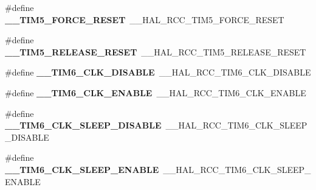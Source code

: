 \begin{DoxyCompactItemize}
\item 
\mbox{\label{group___h_a_l___r_c_c___aliased_gaa07976dd4fea46ea3607d60c91135d57}} 
\#define {\bfseries \+\_\+\+\_\+\+T\+I\+M5\+\_\+\+F\+O\+R\+C\+E\+\_\+\+R\+E\+S\+ET}~\+\_\+\+\_\+\+H\+A\+L\+\_\+\+R\+C\+C\+\_\+\+T\+I\+M5\+\_\+\+F\+O\+R\+C\+E\+\_\+\+R\+E\+S\+ET
\item 
\mbox{\label{group___h_a_l___r_c_c___aliased_ga9147d36f3775a32d40f0abcf2fd38fef}} 
\#define {\bfseries \+\_\+\+\_\+\+T\+I\+M5\+\_\+\+R\+E\+L\+E\+A\+S\+E\+\_\+\+R\+E\+S\+ET}~\+\_\+\+\_\+\+H\+A\+L\+\_\+\+R\+C\+C\+\_\+\+T\+I\+M5\+\_\+\+R\+E\+L\+E\+A\+S\+E\+\_\+\+R\+E\+S\+ET
\item 
\mbox{\label{group___h_a_l___r_c_c___aliased_ga16facf74d71ea54b2a9da63cffe0c99a}} 
\#define {\bfseries \+\_\+\+\_\+\+T\+I\+M6\+\_\+\+C\+L\+K\+\_\+\+D\+I\+S\+A\+B\+LE}~\+\_\+\+\_\+\+H\+A\+L\+\_\+\+R\+C\+C\+\_\+\+T\+I\+M6\+\_\+\+C\+L\+K\+\_\+\+D\+I\+S\+A\+B\+LE
\item 
\mbox{\label{group___h_a_l___r_c_c___aliased_gaa4a746941c7432e4c3cbf7530cbd0b36}} 
\#define {\bfseries \+\_\+\+\_\+\+T\+I\+M6\+\_\+\+C\+L\+K\+\_\+\+E\+N\+A\+B\+LE}~\+\_\+\+\_\+\+H\+A\+L\+\_\+\+R\+C\+C\+\_\+\+T\+I\+M6\+\_\+\+C\+L\+K\+\_\+\+E\+N\+A\+B\+LE
\item 
\mbox{\label{group___h_a_l___r_c_c___aliased_ga03bbe3efed06a8df35996cb58c890af4}} 
\#define {\bfseries \+\_\+\+\_\+\+T\+I\+M6\+\_\+\+C\+L\+K\+\_\+\+S\+L\+E\+E\+P\+\_\+\+D\+I\+S\+A\+B\+LE}~\+\_\+\+\_\+\+H\+A\+L\+\_\+\+R\+C\+C\+\_\+\+T\+I\+M6\+\_\+\+C\+L\+K\+\_\+\+S\+L\+E\+E\+P\+\_\+\+D\+I\+S\+A\+B\+LE
\item 
\mbox{\label{group___h_a_l___r_c_c___aliased_ga0dd96378a8b3691ff2f29d93e80f4291}} 
\#define {\bfseries \+\_\+\+\_\+\+T\+I\+M6\+\_\+\+C\+L\+K\+\_\+\+S\+L\+E\+E\+P\+\_\+\+E\+N\+A\+B\+LE}~\+\_\+\+\_\+\+H\+A\+L\+\_\+\+R\+C\+C\+\_\+\+T\+I\+M6\+\_\+\+C\+L\+K\+\_\+\+S\+L\+E\+E\+P\+\_\+\+E\+N\+A\+B\+LE
\item 
\mbox{\label{group___h_a_l___r_c_c___aliased_ga24edb732ed2e5e6ac7724695b5f21954}} 

\end{DoxyCompactItemize}
